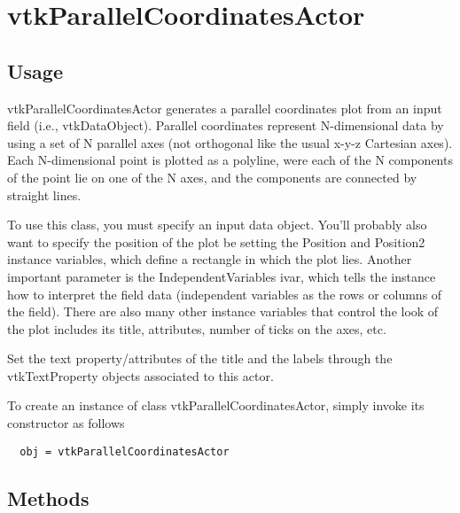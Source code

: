 \section{vtkParallelCoordinatesActor}

\subsection{Usage}

 vtkParallelCoordinatesActor generates a parallel coordinates plot from an
 input field (i.e., vtkDataObject). Parallel coordinates represent
 N-dimensional data by using a set of N parallel axes (not orthogonal like
 the usual x-y-z Cartesian axes). Each N-dimensional point is plotted as a
 polyline, were each of the N components of the point lie on one of the
 N axes, and the components are connected by straight lines.

 To use this class, you must specify an input data object. You'll probably
 also want to specify the position of the plot be setting the Position and
 Position2 instance variables, which define a rectangle in which the plot
 lies. Another important parameter is the IndependentVariables ivar, which
 tells the instance how to interpret the field data (independent variables
 as the rows or columns of the field). There are also many other instance
 variables that control the look of the plot includes its title, 
 attributes, number of ticks on the axes, etc.

 Set the text property/attributes of the title and the labels through the 
 vtkTextProperty objects associated to this actor.

To create an instance of class vtkParallelCoordinatesActor, simply
invoke its constructor as follows
\begin{verbatim}
  obj = vtkParallelCoordinatesActor
\end{verbatim}
\subsection{Methods}

